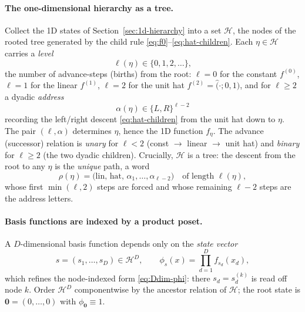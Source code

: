 \documentclass[11pt]{article}
\begin{document}
\paragraph{The one-dimensional hierarchy as a tree.}
Collect the 1D states of Section~\ref{sec:1d-hierarchy} into a set $\mathcal{H}$,
the nodes of the rooted tree generated by the child rule
\eqref{eq:f0}--\eqref{eq:hat-children}.  Each $\eta\in\mathcal{H}$ carries a
\emph{level}
\begin{equation}
  \ell(\eta) \in \{0,1,2,\dots\},
\end{equation}
the number of advance-steps (births) from the root: $\ell=0$ for the constant
$f^{(0)}$, $\ell=1$ for the linear $f^{(1)}$, $\ell=2$ for the unit hat
$f^{(2)}=\hat(\cdot;0,1)$, and for $\ell\ge 2$ a dyadic \emph{address}
\begin{equation}
  \alpha(\eta)\in\{L,R\}^{\ell-2}
\end{equation}
recording the left/right descent \eqref{eq:hat-children} from the unit hat down
to $\eta$.  The pair $(\ell,\alpha)$ determines $\eta$, hence the 1D function
$f_\eta$.  The advance (successor) relation is \emph{unary} for $\ell<2$ (const
$\to$ linear $\to$ unit hat) and \emph{binary} for $\ell\ge2$ (the two dyadic
children).  Crucially, $\mathcal{H}$ is a tree: the descent from the root to any
$\eta$ is the \emph{unique} path, a word
\begin{equation}
  \rho(\eta)
  = \bigl(\text{lin},\,\text{hat},\,\alpha_1,\dots,\alpha_{\ell-2}\bigr)
  \quad\text{of length } \ell(\eta),
  \label{eq:descent-word}
\end{equation}
whose first $\min(\ell,2)$ steps are forced and whose remaining $\ell-2$ steps
are the address letters.

\paragraph{Basis functions are indexed by a product poset.}
A $D$-dimensional basis function depends only on the \emph{state vector}
\begin{equation}
  s = (s_1,\dots,s_D) \in \mathcal{H}^D,
  \qquad
  \phi_s(x) = \prod_{d=1}^D f_{s_d}(x_d),
  \label{eq:phi-state}
\end{equation}
which refines the node-indexed form \eqref{eq:Ddim-phi}: there $s_d=s_d^{(k)}$
is read off node $k$.  Order $\mathcal{H}^D$ componentwise by the ancestor
relation of $\mathcal{H}$; the root state is $\mathbf{0}=(0,\dots,0)$ with
$\phi_{\mathbf 0}\equiv 1$.
\end{document}
